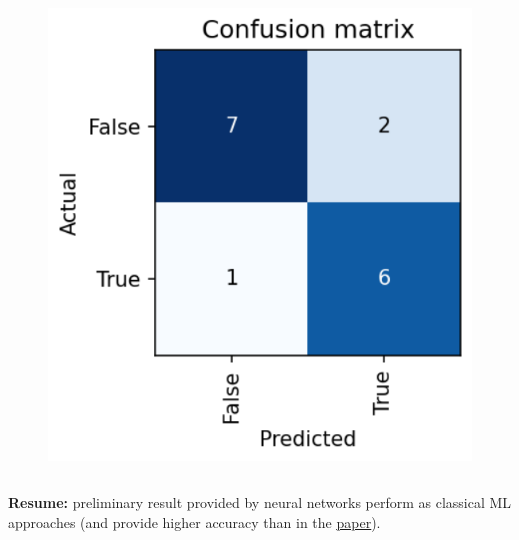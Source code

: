 \documentclass[10pt, xcolor=x11names,compress]{beamer}
\begin{document}
\begin{frame}
\begin{columns}
\begin{column}{0.5\textwidth}
\begin{figure}
			\includegraphics[height=0.55 \textheight]{images/cm_methilation.png}
		\end{figure}
	\end{column}
\end{columns}
\textbf{Resume:} preliminary result provided by neural networks perform as classical ML approaches (and provide higher accuracy than in the \href{http://diposit.ub.edu/dspace/bitstream/2445/125743/1/Esteller\_\%202018.pdf}{{\color{blue}\underline{paper}}}).
\end{frame}
\end{document}

